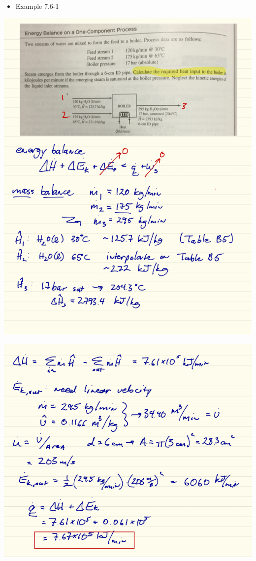 \documentclass[11pt]{article}
\begin{document}
\begin{itemize}
\item Example 7.6-1
\end{itemize}
\includegraphics[width=.9\linewidth]{./figs/Example761a.png}

\includegraphics[width=.9\linewidth]{./figs/Example761b.png}
\end{document}
